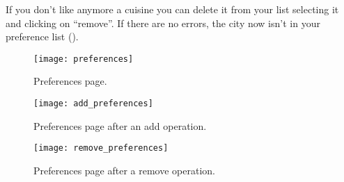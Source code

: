 If you don't like anymore a cuisine you can delete it from your list selecting
it and clicking on ``remove''. If there are no errors, the city now isn't in
your preference list ().

\begin{figure}[H]
	\texttt{[image: preferences]}
	\caption{Preferences page.}\label{fig:preferences}
\end{figure}

\begin{figure}[H]
	\texttt{[image: add\_preferences]}
	\caption{Preferences page after an add
	operation.}\label{fig:add_preferences}
\end{figure}

\begin{figure}[H]
	\texttt{[image: remove\_preferences]}
	\caption{Preferences page after a remove
	operation.}\label{fig:remove_preferences}
\end{figure}

\pagebreak
